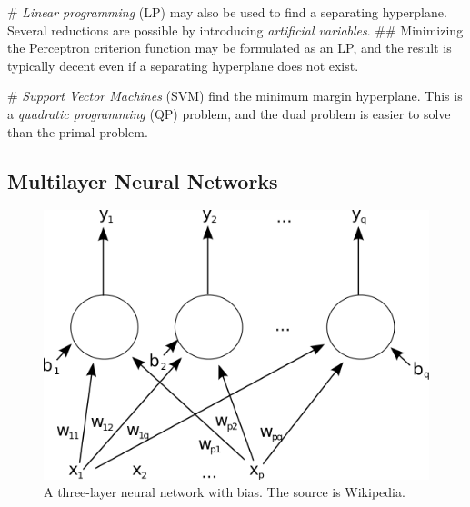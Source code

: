 \documentclass[12pt, a4paper]{article}
\begin{document}
\begin{easylist}[itemize]
# \emph{Linear programming} (LP) may also be used to find a separating hyperplane. Several reductions are possible by introducing \emph{artificial variables}.
## Minimizing the Perceptron criterion function may be formulated as an LP, and the result is typically decent even if a separating hyperplane does not exist.

# \emph{Support Vector Machines} (SVM) find the minimum margin hyperplane.
This is a \emph{quadratic programming} (QP) problem, and the dual problem is easier to solve than the primal problem.
\end{easylist}


\subsection{Multilayer Neural Networks}

\begin{figure}[ht!]
\centering
\includegraphics[width=0.45\linewidth]{figs/neuralnet}
\caption{A three-layer neural network with bias. The source is Wikipedia.}
\label{fig:neuralnet}
\end{figure}
\end{document}
